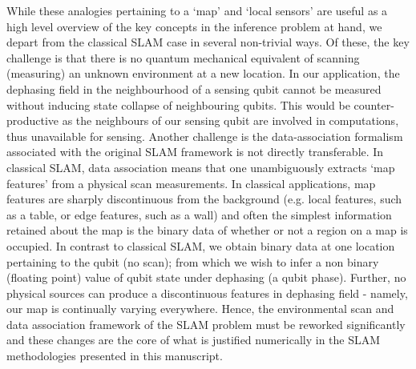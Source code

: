 While these analogies pertaining to a `map' and `local sensors' are useful as a high level overview of the key concepts in the inference problem at hand, we depart from the classical SLAM case in several non-trivial ways. Of these, the key challenge is that there is no quantum mechanical equivalent of scanning (measuring) an unknown environment at a new location. In our application, the dephasing field in the neighbourhood of a sensing qubit cannot be measured  without inducing state collapse of neighbouring qubits. This would be counter-productive as the neighbours of our sensing qubit are involved in computations, thus unavailable for sensing. Another challenge is the data-association formalism associated with the original SLAM framework is not directly transferable. In classical SLAM, data association means that one unambiguously  extracts `map features' from a physical scan measurements. In classical applications, map features are sharply discontinuous from the background (e.g. local features, such as a table, or edge features, such as a wall) and often the simplest information retained about the map is the binary data of whether or not a region on a map is occupied. In contrast to classical SLAM, we obtain binary data at one location pertaining to the qubit (no scan); from which we wish to infer a non binary (floating point) value of qubit state under dephasing (a qubit phase). Further, no physical sources can produce a discontinuous features in dephasing field - namely, our map is  continually varying everywhere. Hence, the environmental scan and data association framework of the SLAM problem must be reworked significantly and these changes are the core of what is justified numerically in the SLAM methodologies presented in this manuscript. \\
\\
